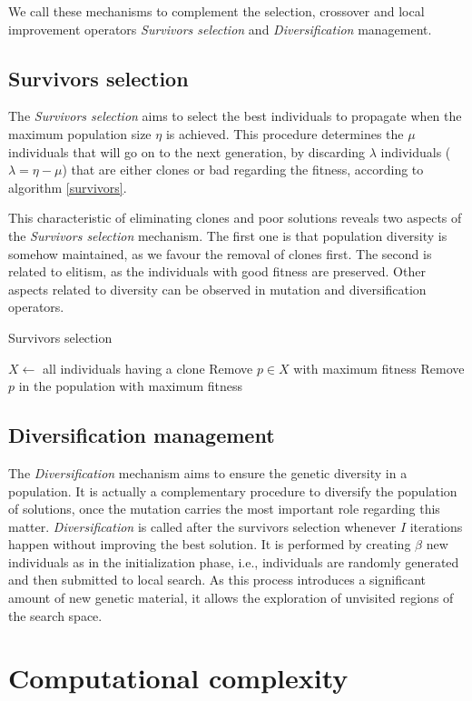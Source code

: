We call these mechanisms to complement the selection, crossover and local improvement operators \textit{Survivors selection} and \textit{Diversification} management.

\subsection{Survivors selection}
The \textit{Survivors selection} aims to select the best individuals to propagate when the maximum population size $\eta$ is achieved. This procedure determines the $\mu$ individuals that will go on to the next generation, by discarding $\lambda$ individuals ($\lambda = \eta - \mu$) that are either clones or bad regarding the fitness, according to algorithm \ref{survivors}.

This characteristic of eliminating clones and poor solutions reveals two aspects of the \textit{Survivors selection} mechanism. The first one is that population diversity is somehow maintained, as we favour the removal of clones first. The second is related to elitism, as the individuals with good fitness are preserved. Other aspects related to diversity can be observed in mutation and diversification operators.

\begin{algorithm}[H]
\caption{Survivors selection}
\label{survivors}
\begin{algorithmic}[1]
\STATE $X \leftarrow $ all individuals having a clone
\STATE Remove $p \in X$ with maximum fitness
\ELSE
\STATE Remove $p$ in the population with maximum fitness
\ENDIF
\ENDFOR
\end{algorithmic}
\end{algorithm}

\subsection{Diversification management}
The \textit{Diversification} mechanism aims to ensure the genetic diversity in a population. It is actually a complementary procedure to diversify the population of solutions, once the mutation carries the most important role regarding this matter. \textit{Diversification} is called after the survivors selection whenever $I$ iterations happen without improving the best solution. It is performed by creating $\beta$ new individuals as in the initialization phase, i.e., individuals are randomly generated and then submitted to local search. As this process introduces a significant amount of new genetic material, it allows the exploration of unvisited regions of the search space.

\section{Computational complexity}